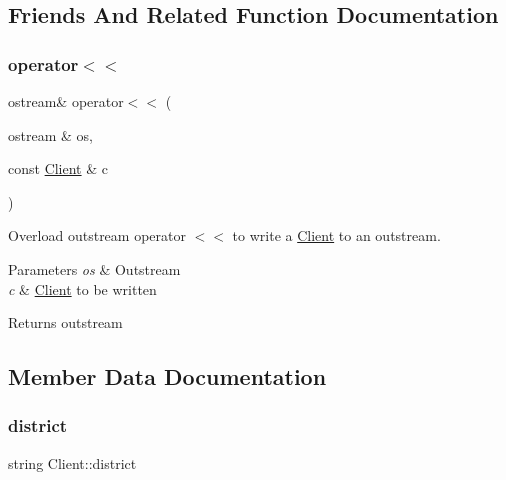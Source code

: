 \subsection{Friends And Related Function Documentation}
\mbox{\label{classClient_ae8980b59fbd6f02e9ebd291446c37bef}} 
\subsubsection{\texorpdfstring{operator$<$$<$}{operator<<}}
{\footnotesize\ttfamily ostream\& operator$<$$<$ (\begin{DoxyParamCaption}\item[{ostream \&}]{os,  }\item[{const \hyperlink{classClient}{Client} \&}]{c }\end{DoxyParamCaption})\hspace{0.3cm}{\ttfamily [friend]}}



Overload outstream operator $<$$<$ to write a \hyperlink{classClient}{Client} to an outstream. 


\begin{DoxyParams}{Parameters}
{\em os} & Outstream\\
\hline
{\em c} & \hyperlink{classClient}{Client} to be written\\
\hline
\end{DoxyParams}
\begin{DoxyReturn}{Returns}
outstream 
\end{DoxyReturn}


\subsection{Member Data Documentation}
\mbox{\label{classClient_a4f613c8876f65ad3de6435efc3e9f6a2}} 
\subsubsection{\texorpdfstring{district}{district}}
{\footnotesize\ttfamily string Client\+::district\hspace{0.3cm}{\ttfamily [private]}}



